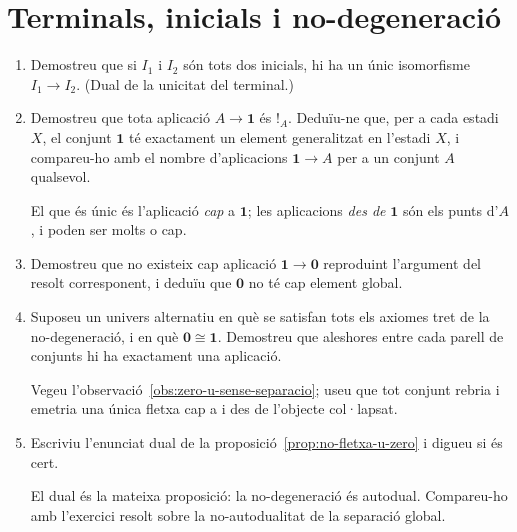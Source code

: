\section{Terminals, inicials i no-degeneració}

\begin{enumerate}[resume]
  \item Demostreu que si \(I_1\) i \(I_2\) són tots dos inicials, hi ha un únic isomorfisme \(I_1\to I_2\). (Dual de la unicitat del terminal.)

  \item Demostreu que tota aplicació \(A\to\mathbf1\) és \({!}_A\). Deduïu-ne que, per a cada estadi \(X\), el conjunt \(\mathbf1\) té exactament un element generalitzat en l'estadi \(X\), i compareu-ho amb el nombre d'aplicacions \(\mathbf1\to A\) per a un conjunt \(A\) qualsevol. \begin{indicacio}El que és únic és l'aplicació \emph{cap} a \(\mathbf1\); les aplicacions \emph{des de} \(\mathbf1\) són els punts d'\(A\), i poden ser molts o cap.\end{indicacio}

  \item Demostreu que no existeix cap aplicació \(\mathbf1\to\mathbf0\) reproduint l'argument del resolt corresponent, i deduïu que \(\mathbf0\) no té cap element global.

  \item Suposeu un univers alternatiu en què se satisfan tots els axiomes tret de la no-degeneració, i en què \(\mathbf0\cong\mathbf1\). Demostreu que aleshores entre cada parell de conjunts hi ha exactament una aplicació. \begin{indicacio}Vegeu l'observació~\ref{obs:zero-u-sense-separacio}; useu que tot conjunt rebria i emetria una única fletxa cap a i des de l'objecte col·lapsat.\end{indicacio}

  \item Escriviu l'enunciat dual de la proposició~\ref{prop:no-fletxa-u-zero} i digueu si és cert. \begin{indicacio}El dual és la mateixa proposició: la no-degeneració és autodual. Compareu-ho amb l'exercici resolt sobre la no-autodualitat de la separació global.\end{indicacio}


\end{enumerate}

